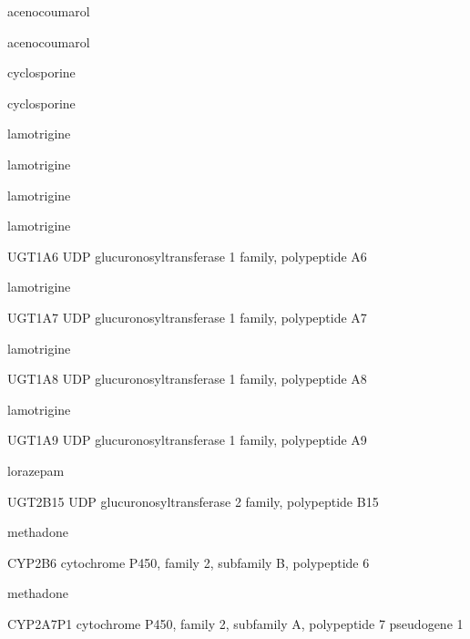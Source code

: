 \documentclass{resume} %
\begin{document}
\begin{rSection}{ acenocoumarol }
\begin{rSection}{ acenocoumarol }
\begin{rSection}{ cyclosporine }
\begin{rSection}{ cyclosporine }
\begin{rSection}{ lamotrigine }
\begin{rSection}{ lamotrigine }
\begin{rSection}{ lamotrigine }
\begin{rSection}{ lamotrigine }
\begin{rSubsection}{ UGT1A6 }{ UDP glucuronosyltransferase 1 family, polypeptide A6 }{}{}
\end{rSubsection}
\begin{rSection}{ lamotrigine }
\item[]
\begin{rSubsection}{ UGT1A7 }{ UDP glucuronosyltransferase 1 family, polypeptide A7 }{}{}
\item[]


\end{rSubsection}
\begin{rSection}{ lamotrigine }
\item[]
\begin{rSubsection}{ UGT1A8 }{ UDP glucuronosyltransferase 1 family, polypeptide A8 }{}{}
\item[]


\end{rSubsection}
\begin{rSection}{ lamotrigine }
\item[]
\begin{rSubsection}{ UGT1A9 }{ UDP glucuronosyltransferase 1 family, polypeptide A9 }{}{}
\item[]


\end{rSubsection}

\end{rSection}
\begin{rSection}{ lorazepam }
\item[]
\begin{rSubsection}{ UGT2B15 }{ UDP glucuronosyltransferase 2 family, polypeptide B15 }{}{}
\item[]


\end{rSubsection}

\end{rSection}
\begin{rSection}{ methadone }
\item[]
\begin{rSubsection}{ CYP2B6 }{ cytochrome P450, family 2, subfamily B, polypeptide 6 }{}{}
\item[]


\end{rSubsection}
\begin{rSection}{ methadone }
\item[]
\begin{rSubsection}{ CYP2A7P1 }{ cytochrome P450, family 2, subfamily A, polypeptide 7 pseudogene 1 }{}{}
\item[]


\end{rSubsection}


\end{rSection}
\end{rSection}
\end{rSection}
\end{rSection}
\end{rSection}
\end{rSection}
\end{rSection}
\end{rSection}
\end{rSection}
\end{rSection}
\end{rSection}
\end{rSection}
\end{document}
